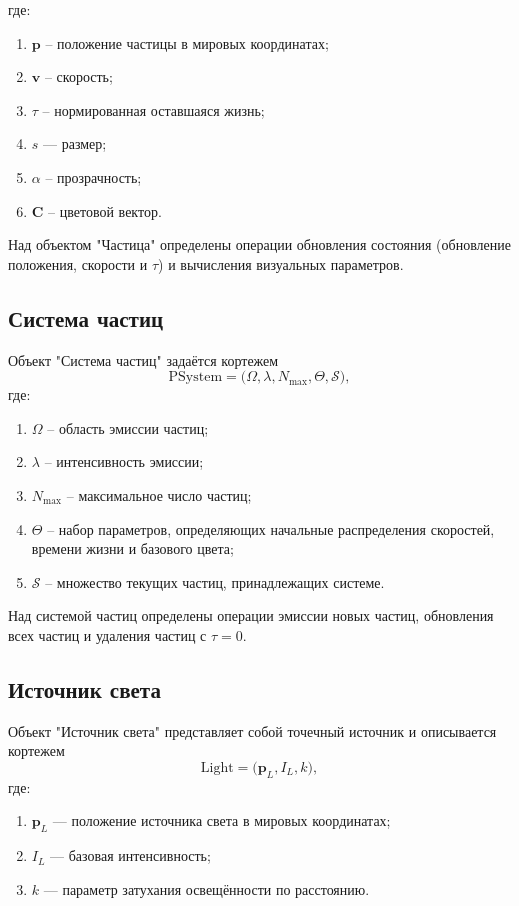 где:
\begin{enumerate}
	\item $\mathbf{p}$ -- положение частицы в мировых координатах;
	\item $\mathbf{v}$ -- скорость;
	\item $\tau$ -- нормированная оставшаяся жизнь;
	\item $s$ --- размер;
	\item $\alpha$ -- прозрачность;
	\item $\mathbf{C}$ -- цветовой вектор.
\end{enumerate}

Над объектом "Частица" определены операции обновления состояния (обновление положения, скорости и $\tau$) и вычисления визуальных параметров.

\subsection{Система частиц}

Объект "Система частиц" задаётся кортежем
\begin{equation}
	\text{PSystem} = \bigl( \Omega, \lambda, N_{\max}, \Theta, \mathcal{S} \bigr),
\end{equation}
где:
\begin{enumerate}
	\item $\Omega$ -- область эмиссии частиц;
	\item $\lambda$ -- интенсивность эмиссии;
	\item $N_{\max}$ -- максимальное число частиц;
	\item $\Theta$ -- набор параметров, определяющих начальные распределения скоростей, времени жизни и базового цвета;
	\item $\mathcal{S}$ -- множество текущих частиц, принадлежащих системе.
\end{enumerate}

Над системой частиц определены операции эмиссии новых частиц, обновления всех частиц и удаления частиц с $\tau = 0$.

\subsection{Источник света}

Объект "Источник света" представляет собой точечный источник и описывается кортежем
\begin{equation}
	\text{Light} = \bigl( \mathbf{p}_{L}, I_{L}, k \bigr),
\end{equation}
где:
\begin{enumerate}
	\item $\mathbf{p}_{L}$ --- положение источника света в мировых координатах;
	\item $I_{L}$ --- базовая интенсивность;
	\item $k$ --- параметр затухания освещённости по расстоянию.
\end{enumerate}

